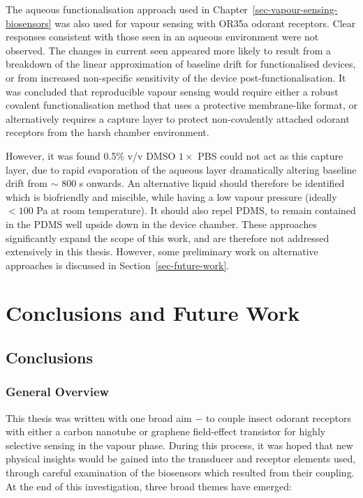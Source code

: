 \documentclass[
  a4paper,
]{scrbook}
\begin{document}
The aqueous functionalisation approach used in
Chapter~\ref{sec-vapour-sensing-biosensors} was also used for vapour
sensing with OR35a odorant receptors. Clear responses consistent with
those seen in an aqueous environment were not observed. The changes in
current seen appeared more likely to result from a breakdown of the
linear approximation of baseline drift for functionalised devices, or
from increased non-specific sensitivity of the device
post-functionalisation. It was concluded that reproducible vapour
sensing would require either a robust covalent functionalisation method
that uses a protective membrane-like format, or alternatively requires a
capture layer to protect non-covalently attached odorant receptors from
the harsh chamber environment.

However, it was found 0.5\% v/v DMSO \(1 \times\) PBS could not act as
this capture layer, due to rapid evaporation of the aqueous layer
dramatically altering baseline drift from \(\sim\) 800 s onwards. An
alternative liquid should therefore be identified which is biofriendly
and miscible, while having a low vapour pressure (ideally \(< 100\) Pa
at room temperature). It should also repel PDMS, to remain contained in
the PDMS well upside down in the device chamber. These approaches
significantly expand the scope of this work, and are therefore not
addressed extensively in this thesis. However, some preliminary work on
alternative approaches is discussed in Section~\ref{sec-future-work}.


\hypertarget{conclusions-and-future-work}{%
\chapter{Conclusions and Future
Work}\label{conclusions-and-future-work}}

\hypertarget{sec-conclusions}{%
\section{Conclusions}\label{sec-conclusions}}

\hypertarget{general-overview-2}{%
\subsection{General Overview}\label{general-overview-2}}

This thesis was written with one broad aim \(-\) to couple insect
odorant receptors with either a carbon nanotube or graphene field-effect
transistor for highly selective sensing in the vapour phase. During this
process, it was hoped that new physical insights would be gained into
the transducer and receptor elements used, through careful examination
of the biosensors which resulted from their coupling. At the end of this
investigation, three broad themes have emerged:
\end{document}
